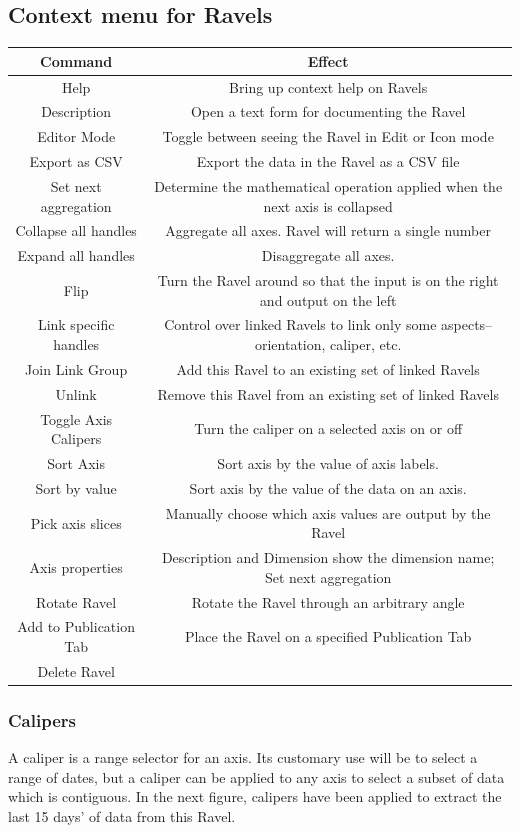 \subsection{Context menu for Ravels}

\begin{tabular}{|c|c|}
\hline 
Command & Effect\tabularnewline
\hline 
\hline 
Help & Bring up context help on Ravels\tabularnewline
\hline 
Description & Open a text form for documenting the Ravel\tabularnewline
\hline 
Editor Mode & Toggle between seeing the Ravel in Edit or Icon mode\tabularnewline
\hline 
Export as CSV & Export the data in the Ravel as a CSV file\tabularnewline
\hline 
Set next aggregation & Determine the mathematical operation applied when the next axis is
collapsed\tabularnewline
\hline 
Collapse all handles & Aggregate all axes. Ravel will return a single number\tabularnewline
\hline 
Expand all handles & Disaggregate all axes. \tabularnewline
\hline 
Flip & Turn the Ravel around so that the input is on the right and output
on the left\tabularnewline
\hline 
Link specific handles & Control over linked Ravels to link only some aspects--orientation,
caliper, etc.\tabularnewline
\hline 
Join Link Group & Add this Ravel to an existing set of linked Ravels\tabularnewline
\hline 
Unlink & Remove this Ravel from an existing set of linked Ravels\tabularnewline
\hline 
Toggle Axis Calipers & Turn the caliper on a selected axis on or off\tabularnewline
\hline 
Sort Axis & Sort axis by the value of axis labels.\tabularnewline
\hline 
Sort by value & Sort axis by the value of the data on an axis.\tabularnewline
\hline 
Pick axis slices & Manually choose which axis values are output by the Ravel\tabularnewline
\hline 
Axis properties & Description and Dimension show the dimension name; Set next aggregation\tabularnewline
\hline 
Rotate Ravel & Rotate the Ravel through an arbitrary angle\tabularnewline
\hline 
Add to Publication Tab & Place the Ravel on a specified Publication Tab\tabularnewline
\hline 
Delete Ravel & \tabularnewline
\hline 
\end{tabular}

\subsubsection{Calipers}

\label{Calipers}A caliper is a range selector for an axis. Its customary
use will be to select a range of dates, but a caliper can be applied
to any axis to select a subset of data which is contiguous. In the
next figure, calipers have been applied to extract the last 15 days'
of data from this Ravel.

